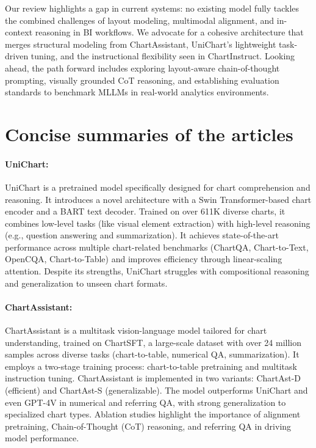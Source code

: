 \documentclass[11pt]{article}
\begin{document}
Our review highlights a gap in current systems: no existing model fully tackles the combined challenges of layout modeling, multimodal alignment, and in-context reasoning in BI workflows. We advocate for a cohesive architecture that merges structural modeling from ChartAssistant, UniChart’s lightweight task-driven tuning, and the instructional flexibility seen in ChartInstruct. Looking ahead, the path forward includes exploring layout-aware chain-of-thought prompting, visually grounded CoT reasoning, and establishing evaluation standards to benchmark MLLMs in real-world analytics environments.

\section*{Concise summaries of the articles}

\paragraph{UniChart:} UniChart is a pretrained model specifically designed for chart comprehension and reasoning. It introduces a novel architecture with a Swin Transformer-based chart encoder and a BART text decoder. Trained on over 611K diverse charts, it combines low-level tasks (like visual element extraction) with high-level reasoning (e.g., question answering and summarization). It achieves state-of-the-art performance across multiple chart-related benchmarks (ChartQA, Chart-to-Text, OpenCQA, Chart-to-Table) and improves efficiency through linear-scaling attention. Despite its strengths, UniChart struggles with compositional reasoning and generalization to unseen chart formats.

\paragraph{ChartAssistant:} ChartAssistant is a multitask vision-language model tailored for chart understanding, trained on ChartSFT, a large-scale dataset with over 24 million samples across diverse tasks (chart-to-table, numerical QA, summarization). It employs a two-stage training process: chart-to-table pretraining and multitask instruction tuning. ChartAssistant is implemented in two variants: ChartAst-D (efficient) and ChartAst-S (generalizable). The model outperforms UniChart and even GPT-4V in numerical and referring QA, with strong generalization to specialized chart types. Ablation studies highlight the importance of alignment pretraining, Chain-of-Thought (CoT) reasoning, and referring QA in driving model performance.
\end{document}
